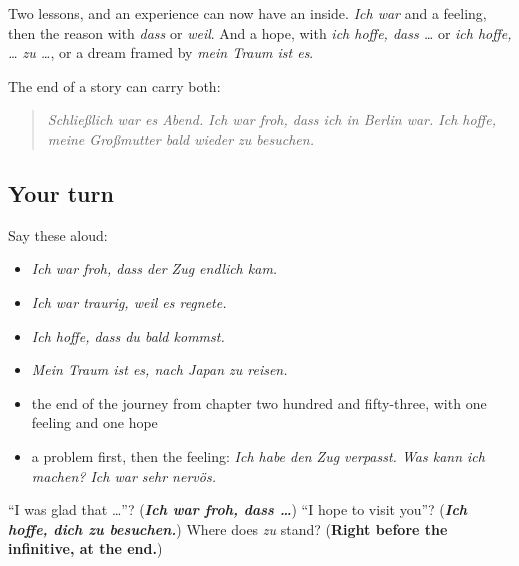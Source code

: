 \begin{grammarlens}[title={What you've built}]
Two lessons, and an experience can now have an inside. \emph{Ich war} and a feeling, then the reason with \emph{dass} or \emph{weil}. And a hope, with \emph{ich hoffe, dass …} or \emph{ich hoffe, … zu …}, or a dream framed by \emph{mein Traum ist es}.

The end of a story can carry both:

\begin{quote}
\emph{Schließlich war es Abend. Ich war froh, dass ich in Berlin war. Ich hoffe, meine Großmutter bald wieder zu besuchen.}
\end{quote}
\end{grammarlens}

\subsection*{Your turn}
Say these aloud:

\begin{itemize}
\raggedright
  \item \emph{Ich war froh, dass der Zug endlich kam.}
  \item \emph{Ich war traurig, weil es regnete.}
  \item \emph{Ich hoffe, dass du bald kommst.}
  \item \emph{Mein Traum ist es, nach Japan zu reisen.}
  \item the end of the journey from chapter two hundred and fifty-three, with one feeling and one hope
  \item a problem first, then the feeling: \emph{Ich habe den Zug verpasst. Was kann ich machen? Ich war sehr nervös.}
\end{itemize}

\begin{tcolorbox}[breakable,colback=teal!4,colframe=teal!35!black,title={Before you move on}]
\textquotedblleft{}I was glad that …\textquotedblright{}? (\emph{\textbf{Ich war froh, dass …}}) \textquotedblleft{}I hope to visit you\textquotedblright{}? (\emph{\textbf{Ich hoffe, dich zu besuchen.}}) Where does \emph{zu} stand? (\textbf{Right before the infinitive, at the end.})
\end{tcolorbox}
